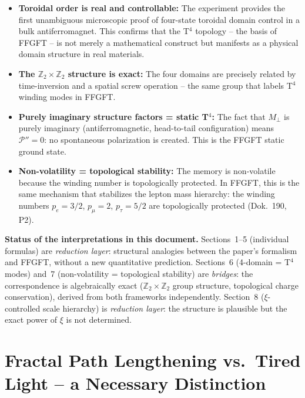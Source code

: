 \begin{itemize}
  \item \textbf{Toroidal order is real and controllable:} The experiment
        provides the first unambiguous microscopic proof of four-state
        toroidal domain control in a bulk antiferromagnet. This confirms
        that the T$^4$ topology -- the basis of FFGFT -- is not merely a
        mathematical construct but manifests as a physical domain structure
        in real materials.
  \item \textbf{The $\mathbb{Z}_2\times\mathbb{Z}_2$ structure is exact:}
        The four domains are precisely related by time-inversion and a
        spatial screw operation -- the same group that labels T$^4$ winding
        modes in FFGFT.
  \item \textbf{Purely imaginary structure factors = static T$^4$:}
        The fact that $M_\perp$ is purely imaginary (antiferromagnetic,
        head-to-tail configuration) means $\mathcal{P}''=0$: no spontaneous
        polarization is created. This is the FFGFT static ground state.
  \item \textbf{Non-volatility = topological stability:} The memory is
        non-volatile because the winding number is topologically protected.
        In FFGFT, this is the same mechanism that stabilizes the lepton mass
        hierarchy: the winding numbers $p_e=3/2$, $p_\mu=2$, $p_\tau=5/2$
        are topologically protected (Dok.~190, P2).
\end{itemize}

\noindent\textbf{Status of the interpretations in this document.}
Sections~1--5 (individual formulas) are \emph{reduction layer}: structural
analogies between the paper's formalism and FFGFT, without a new
quantitative prediction. Sections~6 (4-domain = T$^4$ modes) and~7
(non-volatility = topological stability) are \emph{bridges}: the
correspondence is algebraically exact ($\mathbb{Z}_2\times\mathbb{Z}_2$
group structure, topological charge conservation), derived from both
frameworks independently. Section~8 ($\xi$-controlled scale hierarchy)
is \emph{reduction layer}: the structure is plausible but the exact power
of $\xi$ is not determined.

\section{Fractal Path Lengthening vs.\ Tired Light -- a Necessary Distinction}

